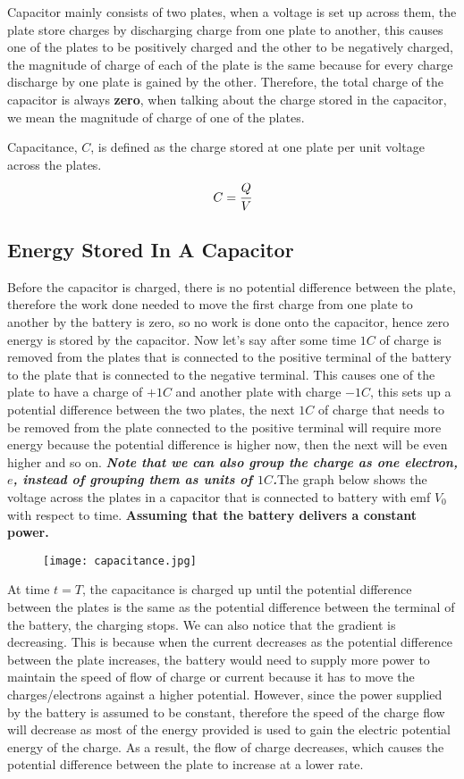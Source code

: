 \documentclass{article}
\begin{document}
Capacitor mainly consists of two plates, when a voltage is set up across them, the plate store charges by discharging charge from one plate to another, this causes one of the plates to be positively charged and the other to be negatively charged, the magnitude of charge of each of the plate is the same because for every charge discharge by one plate is gained by the other. Therefore, the total charge of the capacitor is always \textbf{zero}, when talking about the charge stored in the capacitor, we mean the magnitude of charge of one of the plates.

Capacitance, $C$, is defined as the charge stored at one plate per unit voltage across the plates.
\begin{equation}
    C=\cfrac{Q}{V}
\end{equation}


 \subsection{Energy Stored In A Capacitor}


Before the capacitor is charged, there is no potential difference between the plate, therefore the work done needed to move the first charge from one plate to another by the battery is zero, so no work is done onto the capacitor, hence zero energy is stored by the capacitor. Now let's say after some time $1C$ of charge is removed from the plates that is connected to the positive terminal of the battery to the plate that is connected to the negative terminal. This causes one of the plate to have a charge of $+1C$ and another plate with charge $-1C$, this sets up a potential difference between the two plates, the next $1C$ of charge that needs to be removed from the plate connected to the positive terminal will require more energy because the potential difference is higher now, then the next will be even higher and so on. \textbf{\textit{Note that we can also group the charge as one electron, $e$, instead of grouping them as units of $1C$.}}The graph below shows the voltage across the plates in a capacitor that is connected to battery with emf $V_0$ with respect to time. \textbf{Assuming that the battery delivers a constant power.}
\begin{figure}[H]
    \centering
    \texttt{[image: capacitance.jpg]}
\end{figure}
At time $t=T$, the capacitance is charged up until the potential difference between the plates is the same as the potential difference between the terminal of the battery, the charging stops. We can also notice that the gradient is decreasing. This is because when the current decreases as the potential difference between the plate increases, the battery would need to supply more power to maintain the speed of flow of charge or current because it has to move the charges/electrons against a higher potential. However, since the power supplied by the battery is assumed to be constant, therefore the speed of the charge flow will decrease as most of the energy provided is used to gain the electric potential energy of the charge. As a result, the flow of charge decreases, which causes the potential difference between the plate to increase at a lower rate.
\end{document}
